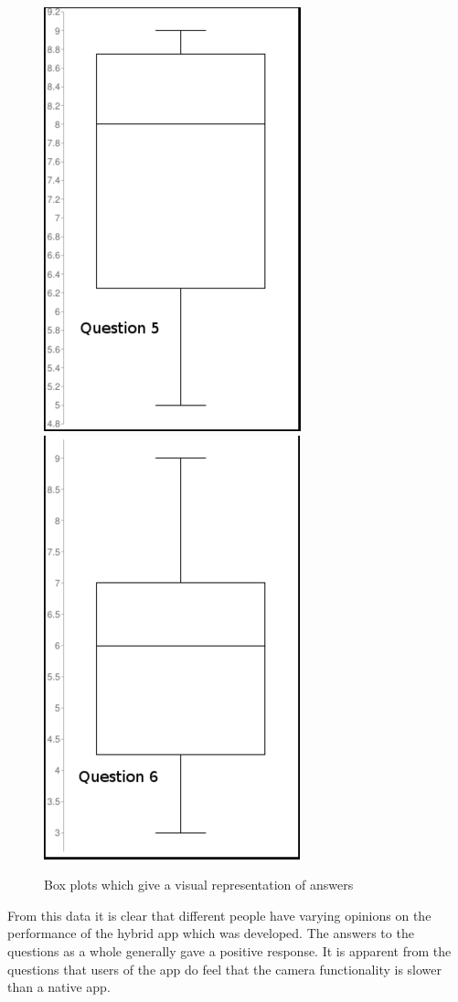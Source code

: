 \begin{center}
\begin{figure}[H]
\includegraphics[scale=0.45]{images/q5}
\includegraphics[scale=0.45]{images/q6}
\caption{Box plots which give a visual representation of answers}
\end{figure}
\end{center}
From this data it is clear that different people have varying opinions on the performance of the hybrid app which was developed. The answers to the questions as a whole generally gave a positive response. It is apparent from the questions that users of the app do feel that the camera functionality is slower than a native app.

